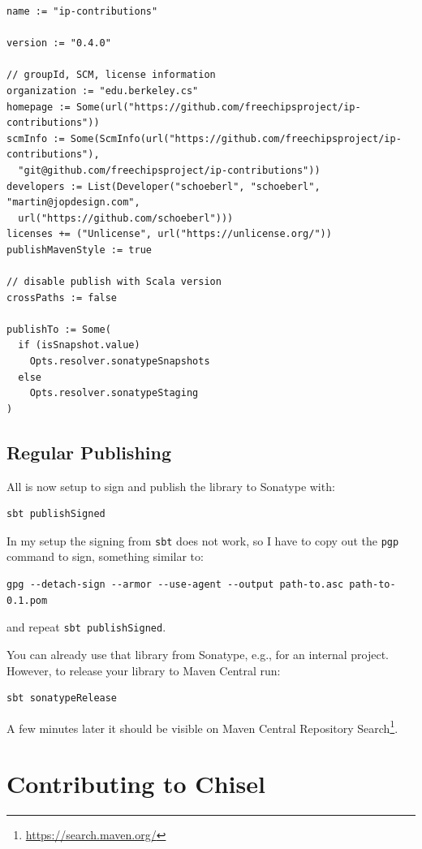 \documentclass[%
    10pt,
    headinclude, footexclude,
    openright, %
    notitlepage,
    cleardoubleempty,
    headsepline,
    pointlessnumbers,
    bibtotoc, idxtotoc,
    ]{scrbook}
\newcommand{\code}[1]{{\small{\texttt{#1}}}}
\newcommand{\myref}[2]{\href{#1}{#2}}
\renewcommand{\myref}[2]{{#2}{\footnote{\url{#1}}}}
\begin{document}
{\small
\begin{verbatim}
name := "ip-contributions"

version := "0.4.0"

// groupId, SCM, license information
organization := "edu.berkeley.cs"
homepage := Some(url("https://github.com/freechipsproject/ip-contributions"))
scmInfo := Some(ScmInfo(url("https://github.com/freechipsproject/ip-contributions"),
  "git@github.com/freechipsproject/ip-contributions"))
developers := List(Developer("schoeberl", "schoeberl", "martin@jopdesign.com",
  url("https://github.com/schoeberl")))
licenses += ("Unlicense", url("https://unlicense.org/"))
publishMavenStyle := true

// disable publish with Scala version
crossPaths := false

publishTo := Some(
  if (isSnapshot.value)
    Opts.resolver.sonatypeSnapshots
  else
    Opts.resolver.sonatypeStaging
)
\end{verbatim}
}

\subsection{Regular Publishing}

All is now setup to sign and publish the library to Sonatype with:

\begin{verbatim}
sbt publishSigned
\end{verbatim}

In my setup the signing from \code{sbt} does not work, so I have to copy
out the \code{pgp} command to sign, something similar to:

\begin{verbatim}
gpg --detach-sign --armor --use-agent --output path-to.asc path-to-0.1.pom
\end{verbatim}

\noindent and repeat \code{sbt publishSigned}.

You can already use that library from Sonatype, e.g., for an internal project.
However, to release your library to Maven Central run:

\begin{verbatim}
sbt sonatypeRelease
\end{verbatim}

A few minutes later it should be visible on \myref{https://search.maven.org/}{Maven Central
Repository Search}.

\section{Contributing to Chisel}
\end{document}
